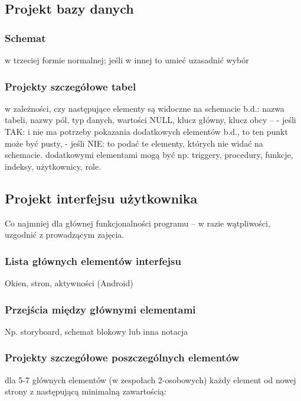 \documentclass[a4paper,12pt]{article}
\begin{document}
\subsection{Projekt bazy danych}

\subsubsection{Schemat}
w trzeciej formie normalnej; jeśli w innej to umieć uzasadnić wybór

\subsubsection{Projekty szczegółowe tabel}
w zależności, czy następujące elementy są widoczne na schemacie b.d.: nazwa tabeli, nazwy pól, typ danych, wartości NULL, klucz główny, klucz obcy –
- jeśli TAK: i nie ma potrzeby pokazania dodatkowych elementów b.d., to ten punkt może być pusty,
- jeśli NIE: to podać te elementy, których nie widać na schemacie.
dodatkowymi elementami mogą być np. triggery, procedury, funkcje, indeksy, użytkownicy, role. 

\subsection{Projekt interfejsu użytkownika}
Co najmniej dla głównej funkcjonalności programu – w razie wątpliwości, uzgodnić z prowadzącym zajęcia.

\subsubsection{Lista głównych elementów interfejsu}

Okien, stron, aktywności (Android)

\subsubsection{Przejścia między głównymi elementami}

Np. storyboard, schemat blokowy lub inna notacja

\subsubsection{Projekty szczegółowe poszczególnych elementów}
dla 5-7 głównych elementów (w zespołach 2-osobowych)
każdy element od nowej strony z następującą minimalną zawartością:
\end{document}
